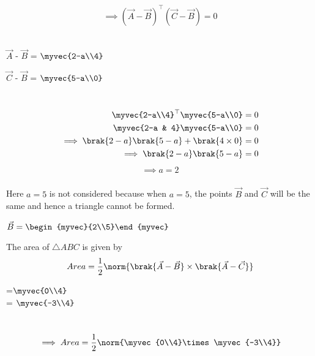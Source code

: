 \documentclass[journal]{IEEEtran}
\begin{document}
\begin{align}
\implies {(\vec{A}-\vec{B})^{\top}}{(\vec{C}-\vec{B})} = 0
\end{align}\\
\begin{center}
$\vec{A}$ - $\vec{B}$ = $\myvec{2-a\\4}$
\end{center}
\begin{center}
$\vec{C}$ - $\vec{B}$ = $\myvec{5-a\\0}$
\end{center}\\
\begin{align}
    \myvec{2-a\\4}^{\top}\myvec{5-a\\0} = 0\\
    \myvec{2-a & 4}\myvec{5-a\\0} = 0\\
    \implies \brak{2-a}\brak{5-a} + \brak{4\times0} = 0\\
    \implies \brak{2-a}\brak{5-a} = 0
\end{align}
\begin{align}
    \implies a = 2
\end{align}
\\
Here $a = 5$ is not considered because when $a = 5$, the points $\vec{B}$ and $\vec{C}$ will be the same and hence a triangle cannot be formed.\\
\begin{center}
$\vec{B}=\begin{myvec}{2\\5}\end{myvec}$
\end{center}
The area of $\triangle ABC$ is given by
		\begin{align}
			Area = \frac{1}{2}\norm{{\brak{\vec{A}-\vec{B}}\times \brak{\vec{A}-\vec{C}}}}
		\end{align}
\begin{center}
     =$\myvec{0\\4}$\\
     = $\myvec{-3\\4}$
\end{center}
\\
\begin{align}
\implies Area = \frac{1}{2}\norm{\myvec{0\\4}\times \myvec{-3\\4}}
\end{align}
\end{document}
